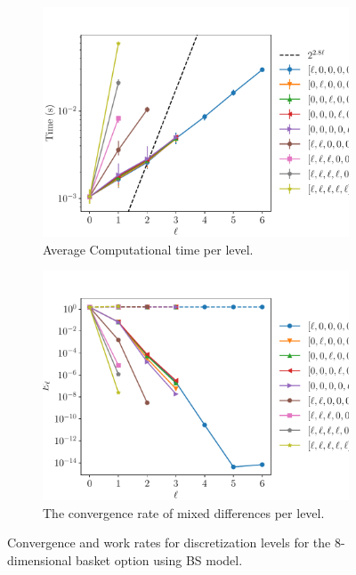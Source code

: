 \documentclass[11pt]{article}
\begin{document}
\begin{figure}[!h]
	\centering
	\begin{subfigure}{.4\textwidth}
		\centering
		\includegraphics[width=1\linewidth]{./figures/8D_basket/level_work.pdf}
		\caption{Average Computational time per level.}
		\label{fig:misc_8D_Basket_sub3}
	\end{subfigure}%
	\begin{subfigure}{.4\textwidth}
		\centering
		\includegraphics[width=1\linewidth]{./figures/8D_basket/levels_error_rate.pdf}
		\caption{The convergence rate of mixed differences per level.}
		\label{fig:misc_8D_Basket_sub4}
	\end{subfigure}%
	\caption{Convergence and work rates for discretization levels for the $8$-dimensional basket option using BS model.}
	\label{fig:misc_8D_Basket_2}
\end{figure}
\FloatBarrier
\end{document}
